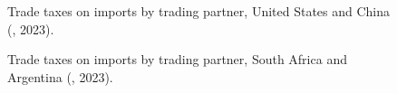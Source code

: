 \begin{figure}[p!]
\centering

\vspace{0.1in}

\caption{Trade taxes on imports by trading partner, United States and China (, 2023).}\label{fig:taxpar1}
\end{figure}

\begin{figure}[p!]
\centering

\vspace{0.1in}

\caption{Trade taxes on imports by trading partner, South Africa and Argentina (, 2023).}\label{fig:taxpar2}
\end{figure}
